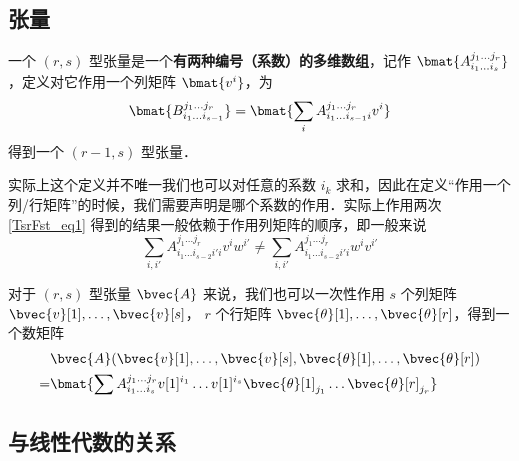 \subsection{张量}

一个 $(r, s)$ 型张量是一个\textbf{有两种编号（系数）的多维数组}，记作 $\bmat{A_{i_1 \dots i_s}^{j_1 \dots j_r}}$，定义对它作用一个列矩阵 $\bmat{v^{i}}$，为
\begin{equation}\label{TsrFst_eq1}
\bmat{B_{i_1 \dots i_{s - 1}}^{j_1 \dots j_r}} = \bmat{\sum_{i} A_{i_1 \dots i_{s - 1} i}^{j_1 \dots j_r} v^{i}}
\end{equation}
得到一个 $(r - 1,s)$ 型张量．

实际上这个定义并不唯一我们也可以对任意的系数 $i_k$ 求和，因此在定义“作用一个列/行矩阵”的时候，我们需要声明是哪个系数的作用．实际上作用两次\autoref{TsrFst_eq1} 得到的结果一般依赖于作用列矩阵的顺序，即一般来说
$$
\sum_{i, i'} A_{i_1 \dots i_{s - 2} i' i}^{j_1 \dots j_r} v^{i} w^{i'} \neq \sum_{i, i'} A_{i_1 \dots i_{s - 2} i' i}^{j_1 \dots j_r} w^{i} v^{i'}
$$

对于 $(r, s)$ 型张量 $\bvec{A}$ 来说，我们也可以一次性作用 $s$ 个列矩阵 $\bvec{v}[1], \dots, \bvec{v}[s]$， $r$ 个行矩阵 $\bvec{\theta}[1], \dots, \bvec{\theta}[r]$，得到一个数矩阵
$$\begin{aligned}
&\bvec{A}(\bvec{v}[1], \dots, \bvec{v}[s], \bvec{\theta}[1], \dots, \bvec{\theta}[r]) \\
= &\bmat{\sum A_{i_1 \dots i_s}^{j_1 \dots j_r} v[1]^{i_1} \dots v[1]^{i_s} \bvec{\theta}[1]_{j_1} \dots \bvec{\theta}[r]_{j_r}}
\end{aligned}$$


\subsection{与线性代数的关系}


